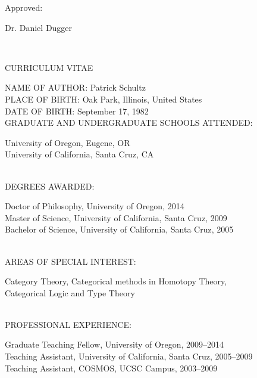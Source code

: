 \documentclass[11pt]{UOthesis}
\begin{document}
	{\singlespace
	Approved: \parbox[t]{3.51in}{
	\underline{\hspace*{3.5in}}
	\centerline{Dr. Daniel Dugger} %
	}} \\[9pt]

	\setlength{\parindent}{.5in} 


	\setlength{\parindent}{0in} 


\newpage

\TOP
\centerline{CURRICULUM VITAE}
{\singlespacing
NAME OF AUTHOR: Patrick Schultz  \\[12pt]

PLACE OF BIRTH: Oak Park, Illinois, United States\\[12pt]

DATE OF BIRTH: September 17, 1982 \\[12pt]

GRADUATE AND UNDERGRADUATE SCHOOLS ATTENDED: \\[6pt]

 \hspace*{.5in}
\parbox[t]{5.5in}{
University of Oregon, Eugene, OR\\
University of California, Santa Cruz, CA
}\\[24pt]

DEGREES AWARDED: \\[6pt]

\hspace*{.5in}
\parbox[t]{5.5in}{
Doctor of Philosophy, University of Oregon, 2014 \\
Master of Science, University of California, Santa Cruz, 2009\\
Bachelor of Science, University of California, Santa Cruz, 2005
}\\[24pt]

AREAS OF SPECIAL INTEREST: \\[6pt]

\hspace*{.5in}
\parbox[t]{5.5in}{
\setlength{\hangindent}{.3in}
Category Theory, Categorical methods in Homotopy Theory,\\
Categorical Logic and Type Theory
} \\[24pt]

PROFESSIONAL EXPERIENCE: \\[6pt]

\hspace*{.5in}
\parbox[t]{5.5in}{
Graduate Teaching Fellow, University of Oregon, 2009--2014\\
Teaching Assistant, University of California, Santa Cruz, 2005--2009\\
Teaching Assistant, COSMOS, UCSC Campus, 2003--2009
} \\[6pt]


}
\end{document}
